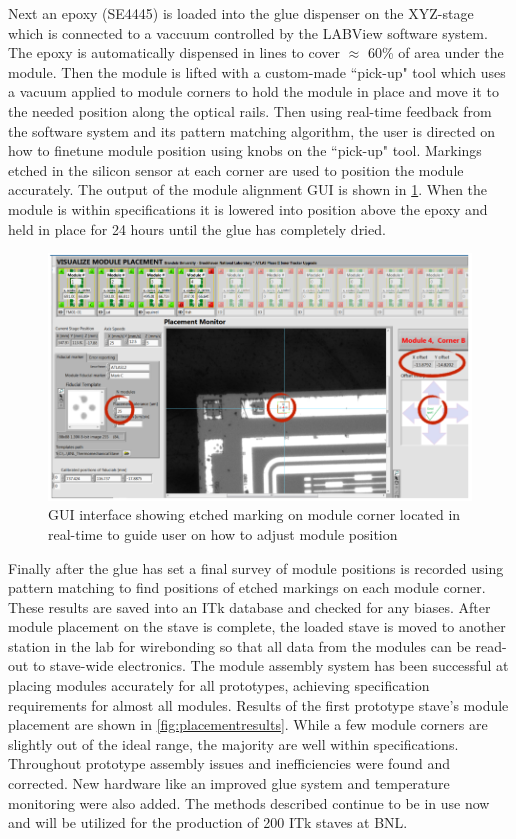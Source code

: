 Next an epoxy (SE4445) is loaded into the glue dispenser on the XYZ-stage which is connected to a vaccuum controlled by the LABView software system. The epoxy is automatically dispensed in lines to cover $\approx$ 60\% of area under the module. Then the module is lifted with a custom-made ``pick-up" tool which uses a vacuum applied to module corners to hold the module in place and move it to the needed position along the optical rails. Then using real-time feedback from the software system and its pattern matching algorithm, the user is directed on how to finetune module position using knobs on the ``pick-up" tool. Markings etched in the silicon sensor at each corner are used to position the module accurately. The output of the module alignment GUI is shown in \ref{fig:modulealignment}. When the module is within specifications it is lowered into position above the epoxy and held in place for 24 hours until the glue has completely dried.

\begin{figure}[!h]
        \centering
    \includegraphics[width=.6\textwidth]{Pictures/labviewscreen.png}
    \caption{GUI interface showing etched marking on module corner located in real-time to guide user on how to adjust module position}
    \label{fig:modulealignment}
\end{figure}

Finally after the glue has set a final survey of module positions is recorded using pattern matching to find positions of etched markings on each module corner. These results are saved into an ITk database and checked for any biases. After module placement on the stave is complete, the loaded stave is moved to another station in the lab for wirebonding so that all data from the modules can be read-out to stave-wide electronics. The module assembly system has been successful at placing modules accurately for all prototypes, achieving specification requirements for almost all modules. Results of the first prototype stave's module placement are shown in \ref{fig:placementresults}. While a few module corners are slightly out of the ideal range, the majority are well within specifications. Throughout prototype assembly issues and inefficiencies were found and corrected. New hardware like an improved glue system and temperature monitoring were also added. The methods described continue to be in use now and will be utilized for the production of 200 ITk staves at BNL. 

